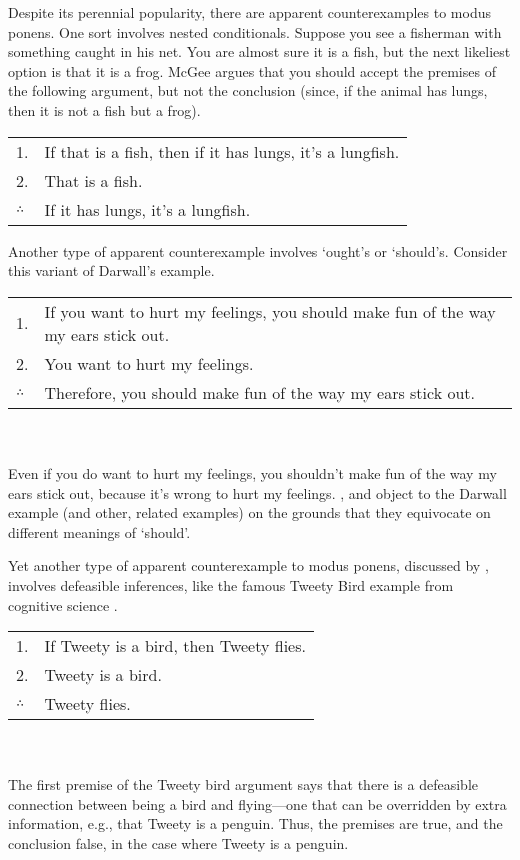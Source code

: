Despite its perennial popularity, there are apparent counterexamples to modus ponens.  One sort \citep{mcgee:mp} involves nested conditionals.  Suppose you see a fisherman with something caught in his net.  You are almost sure it is a fish, but the next likeliest option is that it is a frog.  McGee argues that you should accept the premises of the following argument, but not the conclusion (since, if the animal has lungs, then it is not a fish but a frog).\smallskip\\
\begin{tabular}{ll}
1. & If that is a fish, then if it has lungs, it's a lungfish.\\
2. & That is a fish.\\
\hline
$\therefore$ & If it has lungs, it's a lungfish.
\end{tabular}

\medskip

Another type of apparent counterexample \citep{kolodny-macfarlane, Darwall1983-DARIR} involves `ought's or `should's.  Consider this variant of Darwall's example.\smallskip\\
\begin{tabular}{p{}p{}}
1. & If you want to hurt my feelings, you should make fun of the way my ears stick out.\\
2. & You want to hurt my feelings.\\
\hline
$\therefore$ & Therefore, you should make fun of the way my ears stick out.
\end{tabular}\\\smallskip\\
Even if you do want to hurt my feelings, you shouldn't make fun of the way my ears stick out, because it's wrong to hurt my feelings.  \citet{DowellJL2011-DOWAFC-2}, and \citet{Lauer2014-LAUPND} object to the Darwall example (and other, related examples) on the grounds that they equivocate on different meanings of `should'.

Yet another type of apparent counterexample to modus ponens, discussed by \citet{walton-mp}, involves defeasible inferences, like the famous Tweety Bird example from cognitive science \citep{brewka-tweety}.\smallskip\\
\begin{tabular}{ll}
1. & If Tweety is a bird, then Tweety flies.\\
2. & Tweety is a bird.\\
\hline
$\therefore$ & Tweety flies.
\end{tabular}\\\smallskip\\
The first premise of the Tweety bird argument says that there is a defeasible connection between being a bird and flying---one that can be overridden by extra information, e.g., that Tweety is a penguin.  Thus, the premises are true, and the conclusion false, in the case where Tweety is a penguin.

